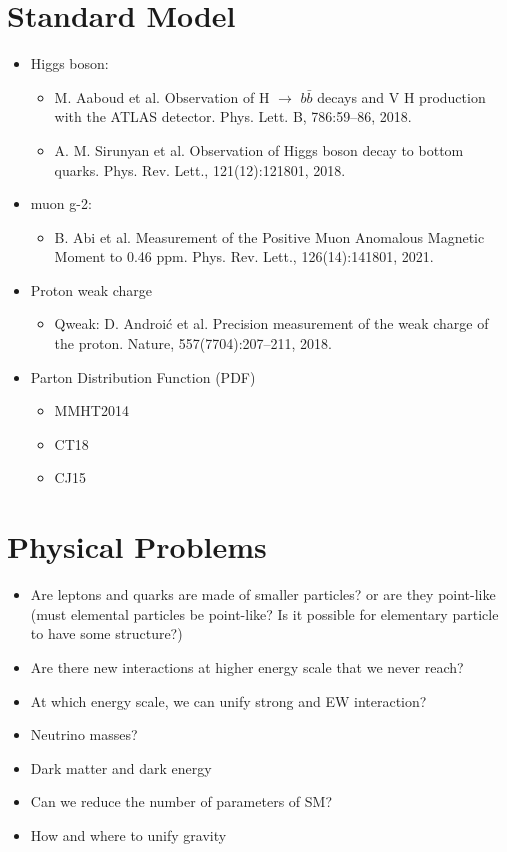 \documentclass{report}
\begin{document}
\section{Standard Model}
\begin{itemize}
    \item Higgs boson:
	\begin{itemize}
	    \item M. Aaboud et al. Observation of H $\rightarrow$ $b\bar{b}$ decays and V H production with the ATLAS detector. Phys. Lett. B, 786:59–86, 2018.
	    \item  A. M. Sirunyan et al. Observation of Higgs boson decay to bottom quarks. Phys. Rev. Lett., 121(12):121801, 2018.
	\end{itemize}

    \item muon g-2:
	\begin{itemize}
	    \item B. Abi et al. Measurement of the Positive Muon Anomalous Magnetic Moment to 0.46
ppm. Phys. Rev. Lett., 126(14):141801, 2021.
	\end{itemize}

    \item Proton weak charge
	\begin{itemize}
	    \item Qweak: D. Androić et al. Precision measurement of the weak charge of the proton. Nature, 557(7704):207–211, 2018.
	\end{itemize}

    \item{Parton Distribution Function (PDF)}
	\begin{itemize}
	    \item MMHT2014
	    \item CT18
	    \item CJ15
	\end{itemize}
\end{itemize}

\section{Physical Problems}
\begin{itemize}
    \item Are leptons and quarks are made of smaller particles? or are they point-like (must elemental particles be point-like? Is it possible for elementary particle to have some structure?)
    \item Are there new interactions at higher energy scale that we never reach?
    \item At which energy scale, we can unify strong and EW interaction?
    \item Neutrino masses?
    \item Dark matter and dark energy
    \item Can we reduce the number of parameters of SM?
    \item How and where to unify gravity 
\end{itemize}
\end{document}
